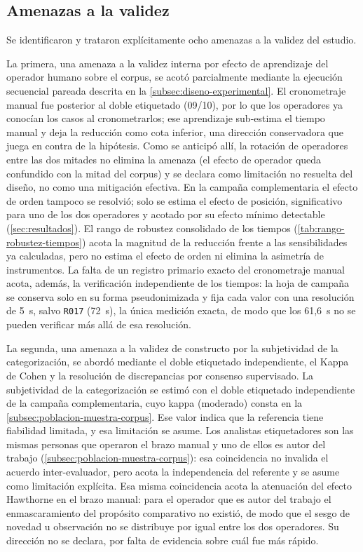 \subsection{Amenazas a la validez}\label{subsec:amenazas-validez}

Se identificaron y trataron explícitamente ocho amenazas a la validez del estudio.

La primera, una amenaza a la validez interna por efecto de aprendizaje del operador humano sobre el corpus, se acotó parcialmente mediante la ejecución secuencial pareada descrita en la \autoref{subsec:diseno-experimental}. El cronometraje manual fue posterior al doble etiquetado (09/10), por lo que los operadores ya conocían los casos al cronometrarlos; ese aprendizaje sub-estima el tiempo manual y deja la reducción como cota inferior, una dirección conservadora que juega en contra de la hipótesis. Como se anticipó allí, la rotación de operadores entre las dos mitades no elimina la amenaza (el efecto de operador queda confundido con la mitad del corpus) y se declara como limitación no resuelta del diseño, no como una mitigación efectiva. En la campaña complementaria el efecto de orden tampoco se resolvió; solo se estima el efecto de posición, significativo para uno de los dos operadores y acotado por su efecto mínimo detectable (\autoref{sec:resultados}). El rango de robustez consolidado de los tiempos (\autoref{tab:rango-robustez-tiempos}) acota la magnitud de la reducción frente a las sensibilidades ya calculadas, pero no estima el efecto de orden ni elimina la asimetría de instrumentos. La falta de un registro primario exacto del cronometraje manual acota, además, la verificación independiente de los tiempos: la hoja de campaña se conserva solo en su forma pseudonimizada y fija cada valor con una resolución de 5~s, salvo \texttt{R017} (72~s), la única medición exacta, de modo que los 61,6~s no se pueden verificar más allá de esa resolución.

La segunda, una amenaza a la validez de constructo por la subjetividad de la categorización, se abordó mediante el doble etiquetado independiente, el Kappa de Cohen y la resolución de discrepancias por consenso supervisado. La subjetividad de la categorización se estimó con el doble etiquetado independiente de la campaña complementaria, cuyo kappa (moderado) consta en la \autoref{subsec:poblacion-muestra-corpus}. Ese valor indica que la referencia tiene fiabilidad limitada, y esa limitación se asume. Los analistas etiquetadores son las mismas personas que operaron el brazo manual y uno de ellos es autor del trabajo (\autoref{subsec:poblacion-muestra-corpus}): esa coincidencia no invalida el acuerdo inter-evaluador, pero acota la independencia del referente y se asume como limitación explícita. Esa misma coincidencia acota la atenuación del efecto Hawthorne en el brazo manual: para el operador que es autor del trabajo el enmascaramiento del propósito comparativo no existió, de modo que el sesgo de novedad u observación no se distribuye por igual entre los dos operadores. Su dirección no se declara, por falta de evidencia sobre cuál fue más rápido.

